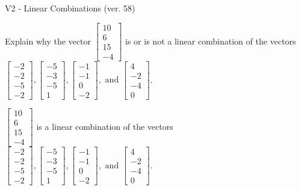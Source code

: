 \begin{exercise}
  \begin{exerciseTitle}V2 - Linear Combinations (ver. 58)\end{exerciseTitle}
  \begin{exerciseStatement}
    Explain why the vector \(\left[\begin{array}{c}
10 \\
6 \\
15 \\
-4
\end{array}\right]\)  is or is not a linear 
	combination of the vectors \(\left[\begin{array}{c}
-2 \\
-2 \\
-5 \\
-2
\end{array}\right] , \left[\begin{array}{c}
-5 \\
-3 \\
-5 \\
1
\end{array}\right] , \left[\begin{array}{c}
-1 \\
-1 \\
0 \\
-2
\end{array}\right] , \text{ and } \left[\begin{array}{c}
4 \\
-2 \\
-4 \\
0
\end{array}\right]\).
	


  \end{exerciseStatement}
  \begin{exerciseAnswer}
   \(\left[\begin{array}{c}
10 \\
6 \\
15 \\
-4
\end{array}\right]\) 
  	 is  
	a linear combination of the vectors \(\left[\begin{array}{c}
-2 \\
-2 \\
-5 \\
-2
\end{array}\right] , \left[\begin{array}{c}
-5 \\
-3 \\
-5 \\
1
\end{array}\right] , \left[\begin{array}{c}
-1 \\
-1 \\
0 \\
-2
\end{array}\right] , \text{ and } \left[\begin{array}{c}
4 \\
-2 \\
-4 \\
0
\end{array}\right]\).


\end{exerciseAnswer}
\end{exercise}
